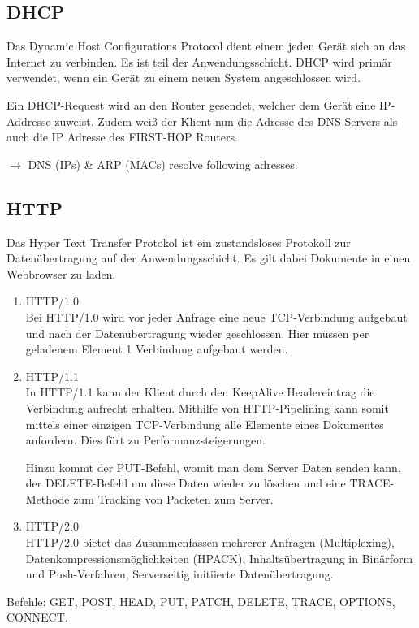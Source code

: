 \documentclass{article}
\begin{document}
    \subsection{DHCP}
    Das Dynamic Host Configurations Protocol dient einem jeden Gerät sich an das Internet zu verbinden. Es ist teil der Anwendungsschicht. DHCP wird primär verwendet, wenn ein Gerät zu einem neuen System angeschlossen wird.
    
    Ein DHCP-Request wird an den Router gesendet, welcher dem Gerät eine IP-Addresse zuweist. Zudem weiß der Klient nun die Adresse des DNS Servers als auch die IP Adresse des FIRST-HOP Routers.
    
    $\rightarrow$ DNS (IPs) \& ARP (MACs) resolve following adresses.
    
    \subsection{HTTP}
    Das Hyper Text Transfer Protokol ist ein zustandsloses Protokoll zur Datenübertragung auf der Anwendungsschicht. Es gilt dabei Dokumente in einen Webbrowser zu laden.
    \begin{enumerate}
        \item HTTP/1.0\\
        Bei HTTP/1.0 wird vor jeder Anfrage eine neue TCP-Verbindung aufgebaut und nach der Datenübertragung wieder geschlossen. Hier müssen per geladenem Element 1 Verbindung aufgebaut werden.
        \item HTTP/1.1\\
        In HTTP/1.1 kann der Klient durch den KeepAlive Headereintrag die Verbindung aufrecht erhalten. Mithilfe von HTTP-Pipelining kann somit mittels einer einzigen TCP-Verbindung alle Elemente eines Dokumentes anfordern. Dies fürt zu Performanzsteigerungen.
        
        Hinzu kommt der PUT-Befehl, womit man dem Server Daten senden kann, der DELETE-Befehl um diese Daten wieder zu löschen und eine TRACE-Methode zum Tracking von Packeten zum Server. 
        \item HTTP/2.0\\
        HTTP/2.0 bietet das Zusammenfassen mehrerer Anfragen (Multiplexing), Datenkompressionsmöglichkeiten (HPACK), Inhaltsübertragung in Binärform und Push-Verfahren, Serverseitig initiierte Datenübertragung.
    \end{enumerate}
    Befehle: GET, POST, HEAD, PUT, PATCH, DELETE, TRACE, OPTIONS, CONNECT.
    
\end{document}
